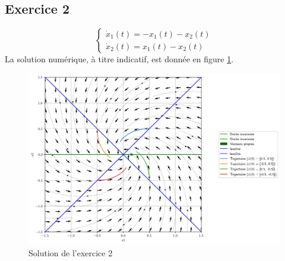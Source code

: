         \subsection{Exercice 2}
            \begin{equation*}
                \begin{cases}
                    \dot{x}_1(t) = - x_1(t) - x_2(t)\\
                    \dot{x}_2(t) = x_1(t) - x_2(t)
                \end{cases}
            \end{equation*}
            La solution numérique, à titre indicatif, est donnée en figure \ref{fig:conclusif_2}.
            \begin{figure}[ht!]
                \centering
                \includegraphics[width=\textwidth]{images/conclusif_2.jpg}
                \caption{Solution de l'exercice 2}
                \label{fig:conclusif_2}
            \end{figure}
